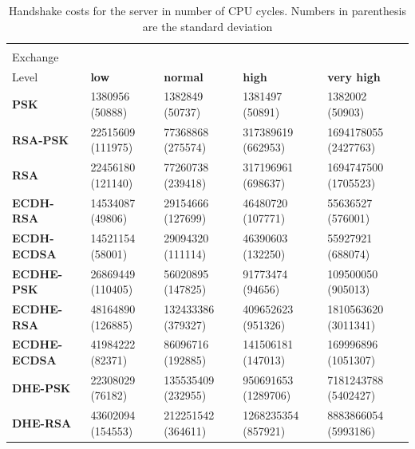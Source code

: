 	\begin{table}[]
  \begin{tabular}{|l|l|l|l|l|}
  \hline
   \backslashbox{Key\\Exchange}{Security\\Level}                     & \textbf{low}      & \textbf{normal}    & \textbf{high}       & \textbf{very high}   \\ \hline
  \textbf{PSK}         & 1380956 (50888)   & 1382849 (50737)    & 1381497 (50891)     & 1382002 (50903)      \\ \hline
  \textbf{RSA-PSK}     & 22515609 (111975) & 77368868 (275574)  & 317389619 (662953)  & 1694178055 (2427763) \\ \hline
  \textbf{RSA}         & 22456180 (121140) & 77260738 (239418)  & 317196961 (698637)  & 1694747500 (1705523) \\ \hline
  \textbf{ECDH-RSA}    & 14534087 (49806)  & 29154666 (127699)  & 46480720 (107771)   & 55636527 (576001)    \\ \hline
  \textbf{ECDH-ECDSA}  & 14521154 (58001)  & 29094320 (111114)  & 46390603 (132250)   & 55927921 (688074)    \\ \hline
  \textbf{ECDHE-PSK}   & 26869449 (110405) & 56020895 (147825)  & 91773474 (94656)    & 109500050 (905013)   \\ \hline
  \textbf{ECDHE-RSA}   & 48164890 (126885) & 132433386 (379327) & 409652623 (951326)  & 1810563620 (3011341) \\ \hline
  \textbf{ECDHE-ECDSA} & 41984222 (82371)  & 86096716 (192885)  & 141506181 (147013)  & 169996896 (1051307)  \\ \hline
  \textbf{DHE-PSK}     & 22308029 (76182)  & 135535409 (232955) & 950691653 (1289706) & 7181243788 (5402427) \\ \hline
  \textbf{DHE-RSA}     & 43602094 (154553) & 212251542 (364611) & 1268235354 (857921) & 8883866054 (5993186) \\ \hline
  \end{tabular}
	\centering \centering \caption{\label{table:server-hs-cost-all-sls} Handshake costs for the server in number of CPU cycles. Numbers in parenthesis are the standard deviation}
  \end{table}
  
